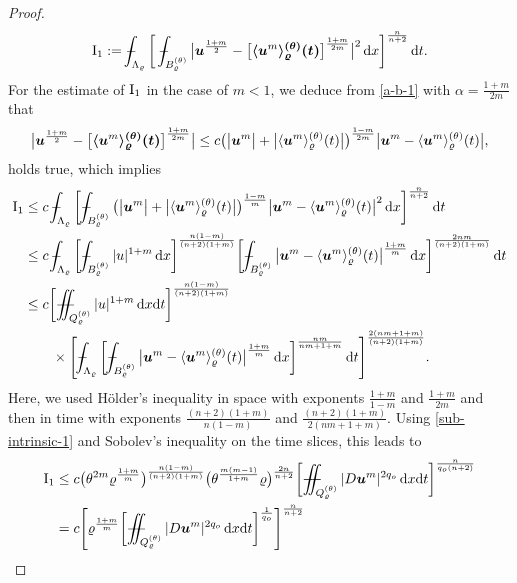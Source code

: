 \documentclass[a4paper, 10pt, american]{amsart}
\numberwithin{theorem}{section}
\numberwithin{equation}{section}
\newcommand{\mint}{- \mskip-19,5mu \int}
\newcommand{\dxdt}{\,\mathrm{d}x\mathrm{d}t}
\newcommand{\dx}{\,\mathrm{d}x}
\newcommand{\dt}{\,\mathrm{d}t}
\renewcommand{\rho}{\varrho}
\newcommand{\power}[2]{\bm{#1^{\mbox{\unboldmath{\scriptsize$#2$}}}}}
\def\Xint#1{\mathchoice
    {\XXint\displaystyle\textstyle{#1}}%
    {\XXint\textstyle\scriptstyle{#1}}%
    {\XXint\scriptstyle\scriptscriptstyle{#1}}%
    {\XXint\scriptscriptstyle\scriptscriptstyle{#1}}%
    \!\int}
\def\XXint#1#2#3{\setbox0=\hbox{$#1{#2#3}{\int}$}
    \vcenter{\hbox{$#2#3$}}\kern-0.5\wd0}
\def\bint{\Xint-}
\def\Xiint#1{\mathchoice
    {\XXiint\displaystyle\textstyle{#1}}%
    {\XXiint\textstyle\scriptstyle{#1}}%
    {\XXiint\scriptstyle\scriptscriptstyle{#1}}%
    {\XXiint\scriptscriptstyle\scriptscriptstyle{#1}}%
    \!\iint}
\def\XXiint#1#2#3{\setbox0=\hbox{$#1{#2#3}{\iint}$}
    \vcenter{\hbox{$#2#3$}}\kern-0.5\wd0}
\def\biint{\Xiint{-\!-}}
\def\<{\langle}
\def\>{\rangle}
\begin{document}
\begin{proof}
\begin{equation}\label{def-I1}
{\rm{I}_1}
:=
\mint_{\Lambda_{\rho}}\bigg[\mint_{B_\rho^{(\theta)}} \big|\power
u{\frac{1+m}2} - \power{\big[\<\power
  um\>_\rho^{(\theta)}(t)\big]}{\frac{1+m}{2m}} \big|^2
\dx\bigg]^\frac{n}{n+2} \dt.
\end{equation}
For the estimate of $\rm{I}_1$ in the case of $m<1$, we deduce from
\eqref{a-b-1} with $\alpha=\frac{1+m}{2m}$ that
\begin{align*}
\big|\power u{\frac{1+m}2} - \power{\big[\<\power um\>_\rho^{(\theta)}(t)\big]}{\frac{1+m}{2m}} \big|
\le
c\big(\big|\power um\big|+\big|\<\power um\>_\rho^{(\theta)}(t)\big|\big)^\frac{1-m}{2m}
\big|\power um-\<\power um\>_\rho^{(\theta)}(t)\big|,
\end{align*}
holds true, which implies
\begin{align}
{\rm{I}_1}
&\le
c\,\bint_{\Lambda_\rho}\bigg[\bint_{B_\rho^{(\theta)}}\big(\big|\power um\big|+\big|\<\power um\>_\rho^{(\theta)}(t)\big|\big)^\frac{1-m}{m}\big|\power um-\<\power um\>_\rho^{(\theta)}(t)\big|^2
\dx\bigg]^\frac{n}{n+2}\dt \nonumber\\
&\le
c\,\bint_{\Lambda_\rho}\bigg[ \bint_{B_\rho^{(\theta)}}|u|^{1+m}\dx\bigg]^\frac{n(1-m)}{(n+2)(1+m)}
\bigg[ \bint_{B_\rho^{(\theta)}} \big|\power um-\<\power um\>_\rho^{(\theta)}(t)\big|^\frac{1+m}m \dx \bigg]^\frac{2nm}{(n+2)(1+m)} \dt \nonumber\\
&\le
c\bigg[\biint_{Q_\rho^{(\theta)}}|u|^{1+m}\dxdt\bigg]^\frac{n(1-m)}{(n+2)(1+m)}\nonumber\\
&\qquad\times
\Bigg[\bint_{\Lambda_\rho}\bigg[ \bint_{B_\rho^{(\theta)}} \big|\power um-\<\power um\>_\rho^{(\theta)}(t)\big|^\frac{1+m}m \dx \bigg]^\frac{nm}{nm+1+m} \dt\Bigg]^\frac{2(nm+1+m)}{(n+2)(1+m)}.\nonumber
\end{align}
Here, we used H\"older's inequality in space with exponents
$\frac{1+m}{1-m}$ and $\frac{1+m}{2m}$ and then in time with exponents
$\frac{(n+2)(1+m)}{n(1-m)}$ and $\frac{(n+2)(1+m)}{2(nm+1+m)}$. 
Using \eqref{sub-intrinsic-1} and Sobolev's inequality on the time slices, this leads to
\begin{align}
{\rm{I}_1}
&\le
c\big(\theta^{2m}\rho^\frac{1+m}m\big)^\frac{n(1-m)}{(n+2)(1+m)}\big(\theta^\frac{m(m-1)}{1+m}\rho\big)^\frac{2n}{n+2}
\bigg[\biint_{Q_\rho^{(\theta)}}|D\power um|^{2q_o}\dxdt\bigg]^\frac{n}{q_o(n+2)} \nonumber\\
&=
c\Bigg[\rho^\frac{1+m}{m}
\bigg[\biint_{Q_\rho^{(\theta)}}|D\power um|^{2q_o}\dxdt\bigg]^\frac{1}{q_o}\Bigg]^\frac{n}{n+2}	

\end{align}
\end{proof}
\end{document}
